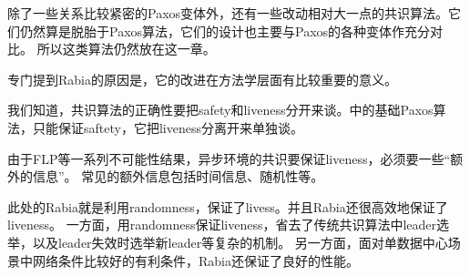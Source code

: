 除了一些关系比较紧密的Paxos变体外，还有一些改动相对大一点的共识算法。它们仍然算是脱胎于Paxos算法，它们的设计也主要与Paxos的各种变体作充分对比。
所以这类算法仍然放在这一章。

专门提到Rabia的原因是，它的改进在方法学层面有比较重要的意义。

我们知道，共识算法的正确性要把safety和liveness分开来谈。\cite{Lamport01}中的基础Paxos算法，只能保证saftety，它把liveness分离开来单独谈。

由于FLP等一系列不可能性结果，异步环境的共识要保证liveness，必须要一些“额外的信息”。
常见的额外信息包括时间信息、随机性等。

此处的Rabia就是利用randomness，保证了livess。并且Rabia还很高效地保证了liveness。
一方面，用randomness保证liveness，省去了传统共识算法中leader选举，以及leader失效时选举新leader等复杂的机制。
另一方面，面对单数据中心场景中网络条件比较好的有利条件，Rabia还保证了良好的性能。

